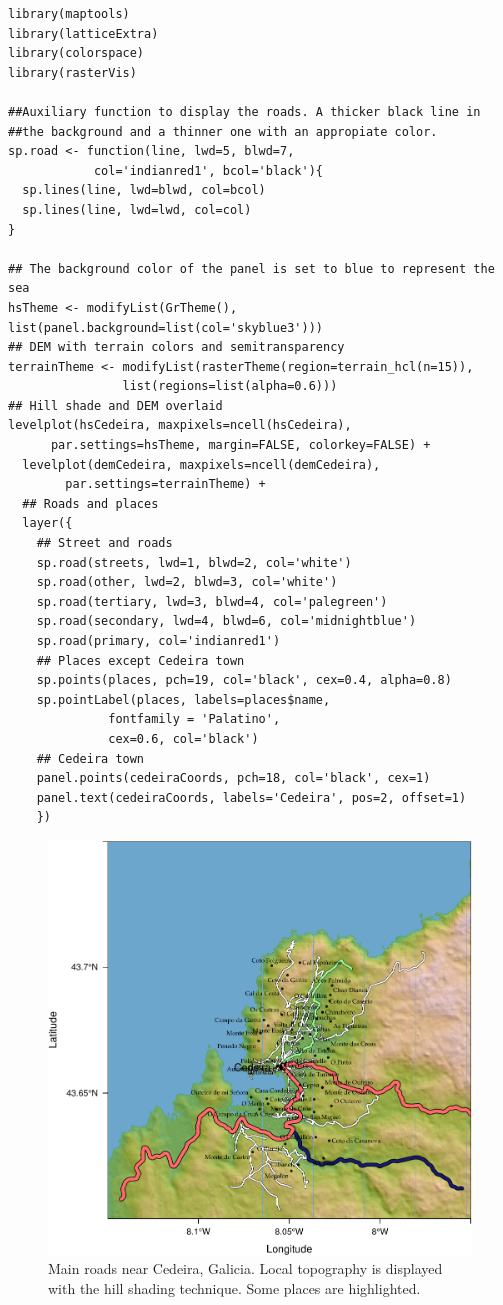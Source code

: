 \documentclass[smallroyalvopaper]{memoir}
\begin{document}
\lstset{language=R,numbers=none}
\begin{lstlisting}
library(maptools)
library(latticeExtra)
library(colorspace)
library(rasterVis)

##Auxiliary function to display the roads. A thicker black line in
##the background and a thinner one with an appropiate color.
sp.road <- function(line, lwd=5, blwd=7,
		    col='indianred1', bcol='black'){
  sp.lines(line, lwd=blwd, col=bcol)
  sp.lines(line, lwd=lwd, col=col)
}

## The background color of the panel is set to blue to represent the sea
hsTheme <- modifyList(GrTheme(), list(panel.background=list(col='skyblue3')))
## DEM with terrain colors and semitransparency
terrainTheme <- modifyList(rasterTheme(region=terrain_hcl(n=15)),
				list(regions=list(alpha=0.6)))
## Hill shade and DEM overlaid
levelplot(hsCedeira, maxpixels=ncell(hsCedeira),
	  par.settings=hsTheme, margin=FALSE, colorkey=FALSE) +
  levelplot(demCedeira, maxpixels=ncell(demCedeira),
	    par.settings=terrainTheme) +
  ## Roads and places
  layer({
    ## Street and roads
    sp.road(streets, lwd=1, blwd=2, col='white')
    sp.road(other, lwd=2, blwd=3, col='white')
    sp.road(tertiary, lwd=3, blwd=4, col='palegreen')
    sp.road(secondary, lwd=4, blwd=6, col='midnightblue')
    sp.road(primary, col='indianred1')
    ## Places except Cedeira town
    sp.points(places, pch=19, col='black', cex=0.4, alpha=0.8)
    sp.pointLabel(places, labels=places$name,
		      fontfamily = 'Palatino', 
		      cex=0.6, col='black')
    ## Cedeira town
    panel.points(cedeiraCoords, pch=18, col='black', cex=1)
    panel.text(cedeiraCoords, labels='Cedeira', pos=2, offset=1)
    })
\end{lstlisting}

\begin{figure}[htb]
\centering
\includegraphics[width=.9\linewidth]{figs/cedeiraOsmar.pdf}
\caption{\label{fig:cedeiraOsmar}Main roads near Cedeira, Galicia. Local topography is displayed with the hill shading technique. Some places are highlighted.}
\end{figure}
\end{document}
